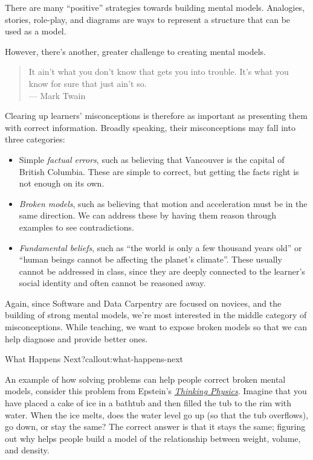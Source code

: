 
There are many ``positive'' strategies towards building mental models.
Analogies, stories, role-play, and diagrams are ways to represent a
structure that can be used as a model.

However, there's another, greater challenge to creating mental models.

\begin{quote}
It ain't what you don't know that gets you into trouble. It's what you
know for sure that just ain't so.\\--- Mark Twain
\end{quote}

Clearing up learners' misconceptions is therefore as important as
presenting them with correct information. Broadly speaking, their
misconceptions may fall into three categories:

\begin{itemize}
\item
  Simple \emph{factual errors}, such as believing that Vancouver is the
  capital of British Columbia. These are simple to correct, but getting
  the facts right is not enough on its own.
\item
  \emph{Broken models}, such as believing that motion and acceleration
  must be in the same direction. We can address these by having them
  reason through examples to see contradictions.
\item
  \emph{Fundamental beliefs}, such as ``the world is only a few thousand
  years old'' or ``human beings cannot be affecting the planet's
  climate''. These usually cannot be addressed in class, since they are
  deeply connected to the learner's social identity and often cannot be
  reasoned away.
\end{itemize}

Again, since Software and Data Carpentry are focused on novices, and the
building of strong mental models, we're most interested in the middle
category of misconceptions. While teaching, we want to expose broken
models so that we can help diagnose and provide better ones.

\begin{callout}{What Happens Next?}{callout:what-happens-next}

An example of how solving problems can help people correct broken mental
models, consider this problem from Epstein's
\emph{\href{http://www.amazon.com/Thinking-Physics-Understandable-Practical-Reality/dp/0935218084/r}{Thinking
Physics}}. Imagine that you have placed a cake of ice in a bathtub and
then filled the tub to the rim with water. When the ice melts, does the
water level go up (so that the tub overflows), go down, or stay the
same? The correct answer is that it stays the same; figuring out why
helps people build a model of the relationship between weight, volume,
and density.
\end{callout}

